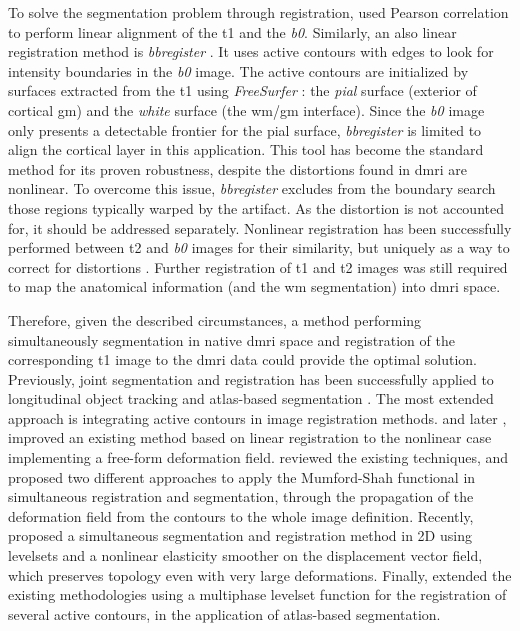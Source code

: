 To solve the segmentation problem through registration, \cite{saad_new_2009} 
  used Pearson correlation to perform linear alignment of the \gls*{t1} and 
  the \emph{b0}.
Similarly, an also linear registration method is \emph{bbregister} \citep{greve_accurate_2009}.
It uses active contours with edges to look for intensity boundaries in the \emph{b0}
  image.
The active contours are initialized by surfaces extracted from the 
  \gls*{t1} using \emph{FreeSurfer} \citep{fischl_freesurfer_2012}:
  the \emph{pial} surface (exterior of cortical \gls*{gm}) and the \emph{white}
  surface (the \gls*{wm}/\gls*{gm} interface). 
Since the \emph{b0} image only presents a detectable frontier for the pial surface,
  \emph{bbregister} is limited to align the cortical layer in this
  application.
This tool has become the standard method for its proven robustness, despite the 
  distortions found in \gls*{dmri} are nonlinear.
To overcome this issue, \emph{bbregister} excludes from the boundary search those
  regions typically warped by the artifact.
As the distortion is not accounted for, it should be addressed separately.
Nonlinear registration has been successfully performed between \gls*{t2} and \emph{b0}
  images for their similarity, but uniquely as a way to correct for distortions
  \citep{kybic_unwarping_2000,studholme_accurate_2000,wu_comparison_2008,tao_variational_2009}.
Further registration of \gls*{t1} and \gls*{t2} images was still required to map the anatomical
  information (and the \gls*{wm} segmentation) into \gls*{dmri} space.

Therefore, given the described circumstances, a method performing simultaneously
  segmentation in native \gls*{dmri} space and registration of the corresponding \gls*{t1} image
  to the \gls*{dmri} data could provide the optimal solution.
Previously, joint segmentation and registration has been successfully applied to
  longitudinal object tracking \citep{paragios_level_2003} and atlas-based
  segmentation \citep{gorthi_active_2011}.
The most extended approach is integrating active contours in image registration 
  methods.
\cite{unal_coupled_2005} and later \cite{wang_joint_2006},
  improved an existing method \citep{yezzi_variational_2003} based on linear registration
  to the nonlinear case implementing a free-form deformation field.
\cite{droske_mumfordshah_2009} reviewed the existing techniques, and proposed two different
  approaches to apply the Mumford-Shah functional \citep{mumford_optimal_1989} in simultaneous
  registration and segmentation, through the propagation of the deformation field from
  the contours to the whole image definition.
Recently, \cite{guyader_combined_2011} proposed a simultaneous segmentation and
  registration method in 2D using levelsets and a nonlinear elasticity smoother on the
  displacement vector field, which preserves topology even with very large deformations.
Finally, \cite{gorthi_active_2011} extended the existing methodologies using a multiphase
  levelset function for the registration of several active contours, in the application
  of atlas-based segmentation.
  
